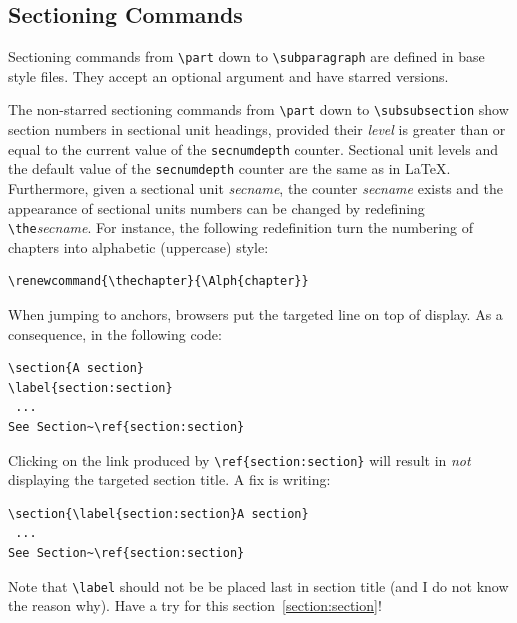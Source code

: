 \subsection{\label{section:section}Sectioning Commands}
Sectioning commands from \verb+\part+ down to
\verb+\subparagraph+ are defined in base style files.
They accept an optional argument and have starred versions.


The non-starred sectioning commands from \verb+\part+ down to
\verb+\subsubsection+ show section numbers in sectional unit headings,
provided their \textit{level} is greater than or equal to the current
value of the \verb+secnumdepth+ counter.
Sectional unit levels and the default value of the \verb+secnumdepth+ counter
are the same as in \LaTeX{}.
Furthermore, given a sectional unit {\it secname}, the
counter {\it secname} exists and the appearance of sectional units
numbers can be changed by redefining \verb+\the+{\it secname}.
For instance, the following redefinition turn the numbering of
chapters into alphabetic (uppercase) style:
\begin{verbatim}
\renewcommand{\thechapter}{\Alph{chapter}}
\end{verbatim}

When jumping to anchors, browsers put the targeted line on top
of display. As a consequence, in the following code:
\begin{verbatim}
\section{A section}
\label{section:section}
 ...
See Section~\ref{section:section}
\end{verbatim}
Clicking on the link produced by
\verb"\ref{section:section}" will result in \emph{not} displaying the
targeted section title.
A fix is writing:
\begin{verbatim}
\section{\label{section:section}A section}
 ...
See Section~\ref{section:section}
\end{verbatim}
Note that \verb+\label+ should not be be placed last in
section title (and I do not know the reason why).
Have a try for this section~\ref{section:section}!

